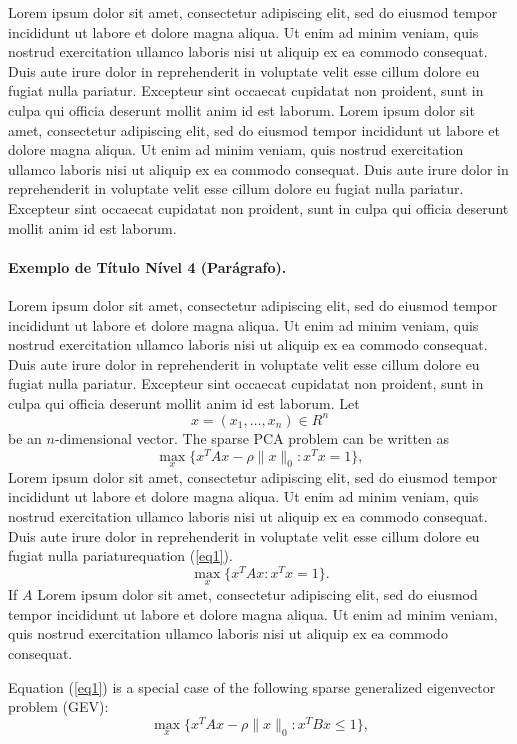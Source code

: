 Lorem ipsum dolor sit amet, consectetur adipiscing elit, sed do eiusmod tempor incididunt ut labore et dolore magna aliqua. Ut enim ad minim veniam, quis nostrud exercitation ullamco laboris nisi ut aliquip ex ea commodo consequat. Duis aute irure dolor in reprehenderit in voluptate velit esse cillum dolore eu fugiat nulla pariatur. Excepteur sint occaecat cupidatat non proident, sunt in culpa qui officia deserunt mollit anim id est laborum. Lorem ipsum dolor sit amet, consectetur adipiscing elit, sed do eiusmod tempor incididunt ut labore et dolore magna aliqua. Ut enim ad minim veniam, quis nostrud exercitation ullamco laboris nisi ut aliquip ex ea commodo consequat. Duis aute irure dolor in reprehenderit in voluptate velit esse cillum dolore eu fugiat nulla pariatur. Excepteur sint occaecat cupidatat non proident, sunt in culpa qui officia deserunt mollit anim id est laborum.

\paragraph{Exemplo de Título Nível 4 (Parágrafo).}

Lorem ipsum dolor sit amet, consectetur adipiscing elit, sed do eiusmod tempor incididunt ut labore et dolore magna aliqua. Ut enim ad minim veniam, quis nostrud exercitation ullamco laboris nisi ut aliquip ex ea commodo consequat. Duis aute irure dolor in reprehenderit in voluptate velit esse cillum dolore eu fugiat nulla pariatur. Excepteur sint occaecat cupidatat non proident, sunt in culpa qui officia deserunt mollit anim id est laborum. 
Let
\[
x=(x_1,\dots,x_n)\in R^n
\]be an \(n\)-dimensional vector. The sparse PCA problem can be written as
\begin{equation}\label{eq1}
\max\limits_{x}\{x^TAx-\rho\|x\|_0:x^Tx=1\},
\end{equation}
Lorem ipsum dolor sit amet, consectetur adipiscing elit, sed do eiusmod tempor incididunt ut labore et dolore magna aliqua. Ut enim ad minim veniam, quis nostrud exercitation ullamco laboris nisi ut aliquip ex ea commodo consequat. Duis aute irure dolor in reprehenderit in voluptate velit esse cillum dolore eu fugiat nulla pariatur\break equation (\ref{eq1}). 
\[\max\limits_{x}\{x^TAx :x^Tx=1\}.\]
If $A$ Lorem ipsum dolor sit amet, consectetur adipiscing elit, sed do eiusmod tempor incididunt ut labore et dolore magna aliqua. Ut enim ad minim veniam, quis nostrud exercitation ullamco laboris nisi ut aliquip ex ea commodo consequat. 


Equation (\ref{eq1}) is a special case of the following sparse generalized eigenvector problem (GEV):
\begin{equation}\label{GEV}
\max\limits_{x}\{x^TAx-\rho \|x\|_0: x^TBx\leq 1\},
\end{equation}

